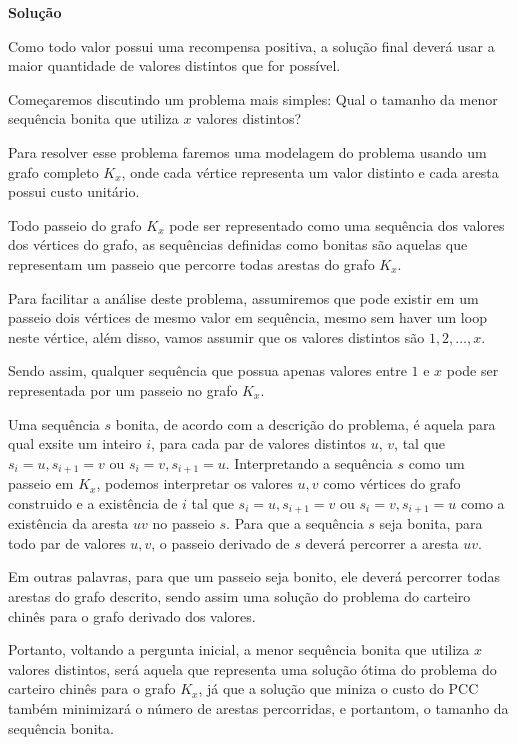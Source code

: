 \documentclass{article}
\begin{document}
        \textbf{Solução}

        Como todo valor possui uma recompensa positiva, a solução final deverá usar a maior quantidade de valores distintos que for possível.

        Começaremos discutindo um problema mais simples: Qual o tamanho da menor sequência bonita que utiliza $x$ valores distintos?

        Para resolver esse problema faremos uma modelagem do problema usando um grafo completo $K_x$, onde cada vértice representa um valor distinto e cada aresta possui custo unitário.

        Todo passeio do grafo $K_x$ pode ser representado como uma sequência dos valores dos vértices do grafo, as sequências definidas como bonitas são aquelas que representam um passeio que percorre todas arestas do grafo $K_x$.

        Para facilitar a análise deste problema, assumiremos que pode existir em um passeio dois vértices de mesmo valor em sequência, mesmo sem haver um loop neste vértice, além disso, vamos assumir que os valores distintos são $1, 2, \dots, x$.

        Sendo assim, qualquer sequência que possua apenas valores entre $1$ e $x$ pode ser representada por um passeio no grafo $K_x$.

        Uma sequência $s$ bonita, de acordo com a descrição do problema, é aquela para qual exsite um inteiro $i$, para cada par de valores distintos $u$, $v$, tal que $s_i = u, s_{i+1} = v$ ou $s_i = v, s_{i+1} = u$.
        Interpretando a sequência $s$ como um passeio em $K_x$, podemos interpretar os valores $u, v$ como vértices do grafo construido e a existência de $i$ tal que $s_i = u, s_{i+1} = v$ ou $s_i = v, s_{i+1} = u$ como a existência da aresta $uv$ no passeio $s$.
        Para que a sequência $s$ seja bonita, para todo par de valores $u, v$, o passeio derivado de $s$ deverá percorrer a aresta $uv$.

        Em outras palavras, para que um passeio seja bonito, ele deverá percorrer todas arestas do grafo descrito, sendo assim uma solução do problema do carteiro chinês para o grafo derivado dos valores.

        Portanto, voltando a pergunta inicial, a menor sequência bonita que utiliza $x$ valores distintos, será aquela que representa uma solução ótima do problema do carteiro chinês para o grafo $K_x$, já que a solução que miniza o custo do PCC também minimizará o número de arestas percorridas, e portantom, o tamanho da sequência bonita.
 
\end{document}
